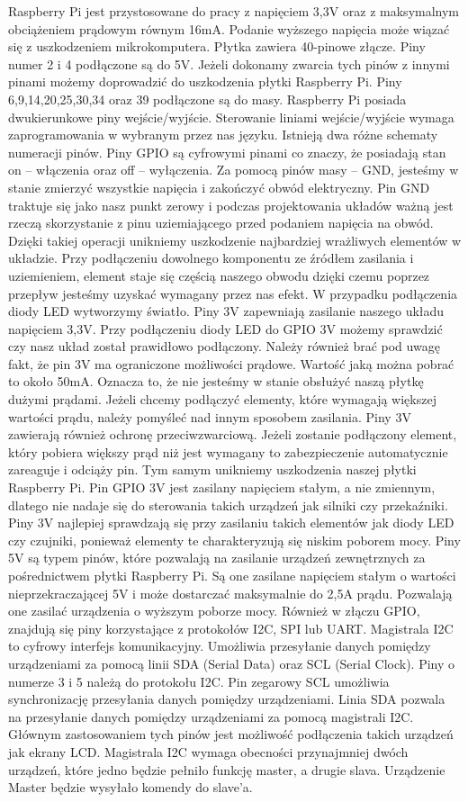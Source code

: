 Raspberry Pi jest przystosowane do pracy z napięciem 3,3V oraz z maksymalnym obciążeniem prądowym równym 16mA. Podanie wyższego napięcia może wiązać się z uszkodzeniem mikrokomputera. Płytka zawiera 40-pinowe złącze. Piny numer 2 i 4 podłączone są do 5V. Jeżeli dokonamy zwarcia tych pinów z innymi pinami możemy doprowadzić do uszkodzenia płytki Raspberry Pi. Piny 6,9,14,20,25,30,34 oraz 39 podłączone są do masy. Raspberry Pi posiada dwukierunkowe piny wejście/wyjście. Sterowanie liniami wejście/wyjście wymaga zaprogramowania w wybranym przez nas języku. Istnieją dwa różne schematy numeracji pinów. Piny GPIO są cyfrowymi pinami co znaczy, że posiadają stan on – włączenia oraz off – wyłączenia. Za pomocą pinów masy – GND, jesteśmy w stanie zmierzyć wszystkie napięcia i zakończyć obwód elektryczny. Pin GND traktuje się jako nasz punkt zerowy i podczas projektowania układów ważną jest rzeczą skorzystanie z pinu uziemiającego przed podaniem napięcia na obwód. Dzięki takiej operacji unikniemy uszkodzenie najbardziej wrażliwych elementów w układzie. Przy podłączeniu dowolnego komponentu ze źródłem zasilania i uziemieniem, element staje się częścią naszego obwodu dzięki czemu poprzez przepływ jesteśmy uzyskać wymagany przez nas efekt. W przypadku podłączenia diody LED wytworzymy światło. Piny 3V zapewniają zasilanie naszego układu napięciem 3,3V. Przy podłączeniu diody LED do GPIO 3V możemy sprawdzić czy nasz układ został prawidłowo podłączony. Należy również brać pod uwagę fakt, że pin 3V ma ograniczone możliwości prądowe. Wartość jaką można pobrać to około 50mA. Oznacza to, że nie jesteśmy w stanie obsłużyć naszą płytkę dużymi prądami. Jeżeli chcemy podłączyć elementy, które wymagają większej wartości prądu, należy pomyśleć nad innym sposobem zasilania. Piny 3V zawierają również ochronę przeciwzwarciową. Jeżeli zostanie podłączony element, który pobiera większy prąd niż jest wymagany to zabezpieczenie automatycznie zareaguje i odciąży pin. Tym samym unikniemy uszkodzenia naszej płytki Raspberry Pi. Pin GPIO 3V jest zasilany napięciem stałym, a nie zmiennym, dlatego nie nadaje się do sterowania takich urządzeń jak silniki czy przekaźniki. Piny 3V najlepiej sprawdzają się przy zasilaniu takich elementów jak diody LED czy czujniki, ponieważ elementy te charakteryzują się niskim poborem mocy. Piny 5V są typem pinów, które pozwalają na zasilanie urządzeń zewnętrznych za pośrednictwem płytki Raspberry Pi. Są one zasilane napięciem stałym o wartości nieprzekraczającej 5V i może dostarczać maksymalnie do 2,5A prądu. Pozwalają one zasilać urządzenia o wyższym poborze mocy. Również w złączu GPIO, znajdują się piny korzystające z protokołów I2C, SPI lub UART. Magistrala I2C to cyfrowy interfejs komunikacyjny. Umożliwia przesyłanie danych pomiędzy urządzeniami za pomocą linii SDA (Serial Data) oraz SCL (Serial Clock). Piny o numerze 3 i 5 należą do protokołu I2C. Pin zegarowy SCL umożliwia synchronizację przesyłania danych pomiędzy urządzeniami. Linia SDA pozwala na przesyłanie danych pomiędzy urządzeniami za pomocą magistrali I2C. Głównym zastosowaniem tych pinów jest możliwość podłączenia takich urządzeń jak ekrany LCD. Magistrala I2C wymaga obecności przynajmniej dwóch urządzeń, które jedno będzie pełniło funkcję master, a drugie slava. Urządzenie Master będzie wysyłało komendy do slave’a. 